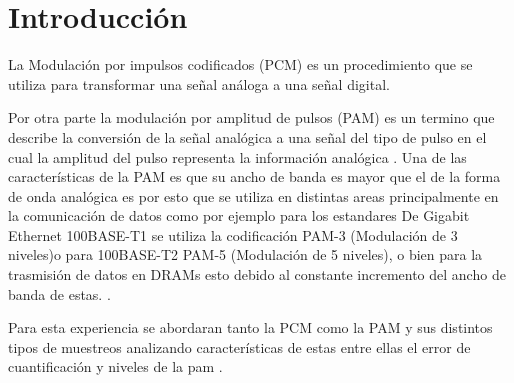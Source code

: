 \section{Introducción}\label{sec:introduccion}

La Modulación por impulsos codificados (PCM) es un procedimiento que se utiliza para transformar una señal análoga a una señal digital. 

Por otra parte la modulación por amplitud de pulsos (PAM) es un termino que describe la conversión de la señal analógica a una señal del tipo de pulso en el cual la amplitud del pulso representa la información analógica \cite{PAM:Couch}. Una de las características de la PAM es que su ancho de banda es mayor que el de la forma de onda analógica es por esto que se utiliza en distintas areas principalmente en la comunicación de datos como por ejemplo para los estandares De Gigabit Ethernet 100BASE-T1 se utiliza la codificación PAM-3 (Modulación de 3 niveles)o para 100BASE-T2 PAM-5 (Modulación de 5 niveles), o bien para la trasmisión de datos en DRAMs esto debido al constante incremento del ancho de banda de estas.  \cite{electronics10151768}. 

Para esta experiencia se abordaran tanto la PCM como la PAM y sus distintos tipos de muestreos analizando características de estas entre ellas el error de cuantificación y niveles de la pam .